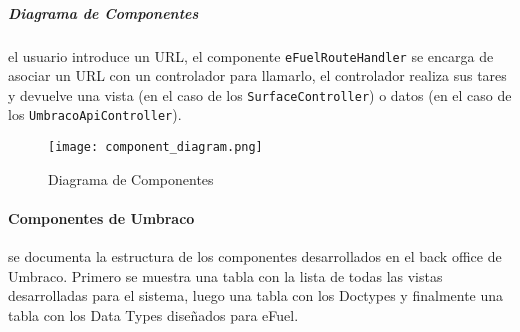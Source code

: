 \subparagraph*{Diagrama de Componentes} el usuario introduce un URL, el componente \verb|eFuelRouteHandler| se encarga de asociar un URL con un controlador para llamarlo, el controlador realiza sus tares y devuelve una vista (en el caso de los \verb|SurfaceController|) o datos (en el caso de los \verb|UmbracoApiController|).

\begin{figure}[H]
    \texttt{[image: component\_diagram.png]}
    \caption{Diagrama de Componentes}
    \label{fig:component_diagram}
    \centering
\end{figure}

\paragraph{Componentes de Umbraco} se documenta la estructura de los componentes desarrollados en el back office de Umbraco. Primero se muestra una tabla con la lista de todas las vistas desarrolladas para el sistema, luego una tabla con los Doctypes y finalmente una tabla con los Data Types diseñados para eFuel.

